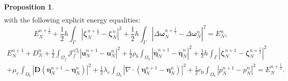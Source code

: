 \documentclass[11pt]{article}
\newcommand{\bd}{\boldsymbol}
\theoremstyle{definition}
\newtheorem{proposition}{Proposition}[section]
\begin{document}
\begin{proposition}
\begin{multline}
\end{multline}
with the following explicit energy equalities:
\begin{equation*}
E^{n + \frac{1}{2}}_{N} + \frac{1}{2} h \int_{\Gamma} |\bd{\zeta}^{n + \frac{1}{2}}_{N} - \bd{\zeta}^{n}_{N}|^{2} + \frac{1}{2} h \int_{\Gamma} |\Delta \bd{\omega}^{n + \frac{1}{2}}_{N} - \Delta \bd{\omega}^{n}_{N}|^{2} = E^{n}_{N},
\end{equation*}
\begin{multline*}
E^{n + 1}_{N} + D^{n}_{N} + \frac{1}{2} \int_{\Omega_{f}} \mathcal{J}^{\omega^{n}_{N}}_{f} |\bd{u}^{n + 1}_{N} - \bd{u}^{n}_{N}|^{2} + \frac{1}{2} \rho_{b} \int_{\Omega_{b}} \left|\dot{\bd{\eta}}^{n + 1}_{N} - \dot{\bd{\eta}}^{n}_{N}\right|^{2} + \frac{1}{2} h \int_{\Gamma} |\bd{\zeta}^{n + 1}_{N} - \bd{\zeta}^{n + \frac{1}{2}}_{N}|^{2} \\
+ \mu_{e} \int_{\Omega_{b}} |\bd{D}(\bd{\eta}^{n + 1}_{N} - \bd{\eta}^{n}_{N})|^{2} + \frac{1}{2} \lambda_{e} \int_{\Omega_{b}} |\nabla \cdot (\bd{\eta}^{n + 1}_{N} - \bd{\eta}^{n}_{N})|^{2} + \frac{1}{2} c_{0} \int_{\Omega_{b}} |p^{n + 1}_{N} - p^{n}_{N}|^{2} = E^{n + \frac{1}{2}}_{N}.
\end{multline*}
\end{proposition}
\end{document}
